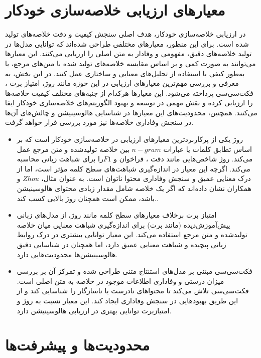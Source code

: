 \section{معیارهای ارزیابی خلاصه‌سازی خودکار}
در ارزیابی خلاصه‌سازی خودکار، هدف اصلی سنجش کیفیت و دقت خلاصه‌های تولید شده است. برای این منظور، معیارهای مختلفی طراحی شده‌اند که توانایی مدل‌ها در تولید خلاصه‌های دقیق، مفهومی و وفادار به متن اصلی را ارزیابی می‌کنند. این معیارها می‌توانند به صورت کمی و بر اساس مقایسه خلاصه‌های تولید شده با متن‌های مرجع، یا به‌طور کیفی با استفاده از تحلیل‌های معنایی و ساختاری عمل کنند. در این بخش، به معرفی و بررسی مهم‌ترین معیارهای ارزیابی در این حوزه مانند روژ، امتیاز برت ، فکت‌سی‌سی پرداخته می‌شود. این معیارها هرکدام از جنبه‌های مختلف کیفیت خلاصه‌ها را ارزیابی کرده و نقش مهمی در توسعه و بهبود الگوریتم‌های خلاصه‌سازی خودکار ایفا می‌کنند. همچنین، محدودیت‌های این معیارها در شناسایی هالوسینیشن و چالش‌های آن‌ها در سنجش وفاداری خلاصه‌ها نیز مورد بررسی قرار خواهد گرفت.
\begin{itemize}
	\item روژ
	 یکی از پرکاربردترین معیارهای ارزیابی در خلاصه‌سازی خودکار است که بر اساس تطابق کلمات یا عبارات $n-gram$ بین خلاصه تولیدشده و متن مرجع عمل می‌کند. روژ شاخص‌هایی مانند دقت  ، فراخوان  و $F1 $را برای شباهت زبانی محاسبه می‌کند. اگرچه این معیار در اندازه‌گیری شباهت‌های سطح کلمه مؤثر است، اما از درک معنایی عمیق و سنجش وفاداری محتوا ناتوان است. به عنوان مثال، $Zhou$ و همکاران نشان داده‌اند که اگر یک خلاصه شامل مقدار زیادی محتوای هالوسینیشن باشد، ممکن است همچنان روژ بالایی کسب کند.\cite{zhou-etal-2021-detecting,lin-2004-rouge}.
	\item 
	امتیاز برت برخلاف معیارهای سطح کلمه مانند روژ، از مدل‌های زبانی پیش‌آموزش‌دیده (مانند برت) برای اندازه‌گیری شباهت معنایی میان خلاصه تولیدشده و متن مرجع استفاده می‌کند. این معیار توانایی بیشتری در درک روابط زبانی پیچیده و شباهت معنایی عمیق دارد، اما همچنان در شناسایی دقیق هالوسینیشن‌ها محدودیت‌هایی دارد\cite{zhang-etal-2024-benchmarking}.
	\item 
	فکت‌سی‌سی مبتنی بر مدل‌های استنتاج متنی طراحی شده و تمرکز آن بر بررسی میزان درستی و وفاداری اطلاعات موجود در خلاصه به متن اصلی است. فکت‌سی‌سی تلاش می‌کند تا محتواهای نادرست یا ناسازگار را شناسایی کند و از این طریق بهبودهایی در سنجش وفاداری ایجاد کند. این معیار نسبت به روژ و امتیازبرت توانایی بهتری در ارزیابی هالوسینیشن دارد\cite{factcc-etal-2020-evaluating}.
\end{itemize}
\section{محدودیت‌ها و پیشرفت‌ها}

